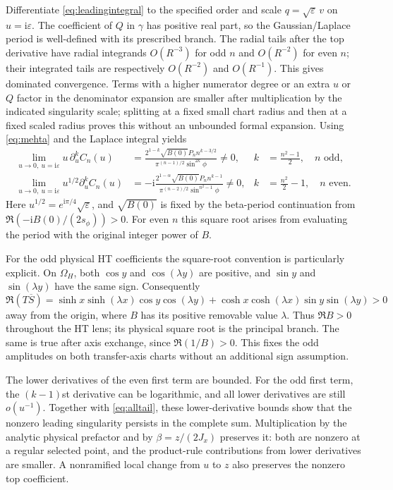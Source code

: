 \documentclass[11pt]{article}
\numberwithin{equation}{section}
\theoremstyle{definition}
\newcommand{\ii}{\mathrm i}
\newcommand{\eps}{\varepsilon}
\newcommand{\OH}{\Omega_H}
\begin{document}
Differentiate \eqref{eq:leadingintegral} to the specified order and
scale $q=\sqrt\eps\,v$ on $u=\ii\eps$. The coefficient of $Q$ in
$\gamma$ has positive real part, so the Gaussian/Laplace period is
well-defined with its prescribed branch. The radial tails after the
top derivative have radial integrands $O(R^{-3})$ for odd $n$ and
$O(R^{-2})$ for even $n$; their integrated tails are respectively
$O(R^{-2})$ and $O(R^{-1})$. This gives dominated convergence.
Terms with a higher numerator
degree or an extra $u$ or $Q$ factor in the denominator expansion are
smaller after multiplication by the indicated singularity scale;
splitting at a fixed small chart radius and then at a fixed scaled
radius proves this without an unbounded formal expansion.
Using \eqref{eq:mehta} and the Laplace integral yields
\begin{align}
 \lim_{u\to0,\ u=\ii\eps}u\,\partial_u^kC_n(u)
 &=\frac{2^{1-k}\sqrt{B(0)}P_n n^{k-3/2}}
        {\pi^{(n-1)/2}\sin^{2k}\phi}\ne0,
 &k&=\frac{n^2-1}{2},\quad n\text{ odd},\label{eq:oddfirst}\\
 \lim_{u\to0,\ u=\ii\eps}u^{1/2}\partial_u^kC_n(u)
 &=-\ii\frac{2^{1-\alpha}\sqrt{B(0)}P_n n^{k-1}}
        {\pi^{(n-2)/2}\sin^{n^2-1}\phi}\ne0,
 &k&=\frac{n^2}{2}-1,\quad n\text{ even}.\label{eq:evenfirst}
\end{align}
Here $u^{1/2}=e^{\ii\pi/4}\sqrt\eps$, and $\sqrt{B(0)}$ is fixed
by the beta-period continuation from
$\Re(-\ii B(0)/(2s_\phi))>0$. For even $n$ this square root arises
from evaluating the period with the original integer power of $B$.

For the odd physical HT coefficients the square-root convention is
particularly explicit. On $\OH$, both $\cos y$ and $\cos(\lambda y)$
are positive, and $\sin y$ and $\sin(\lambda y)$ have the same sign.
Consequently
\[
 \Re(T\overline S)=\sinh x\sinh(\lambda x)\cos y\cos(\lambda y)
 +\cosh x\cosh(\lambda x)\sin y\sin(\lambda y)>0
\]
away from the origin, where $B$ has its positive removable value
$\lambda$. Thus $\Re B>0$ throughout the HT lens; its physical square
root is the principal branch. The same is true after axis exchange,
since $\Re(1/B)>0$. This fixes the odd amplitudes on both transfer-axis
charts without an additional sign assumption.

The lower derivatives of the even first term are bounded. For the odd
first term, the $(k-1)$st derivative can be logarithmic, and all lower
derivatives are still $o(u^{-1})$. Together with
\eqref{eq:alltail}, these lower-derivative bounds show that the nonzero
leading singularity persists in the complete sum. Multiplication by the analytic
physical prefactor and by $\beta=z/(2J_x)$ preserves it: both are
nonzero at a regular selected point, and the product-rule contributions
from lower derivatives are smaller. A nonramified local change from
$u$ to $z$ also preserves the nonzero top coefficient.
\end{document}
